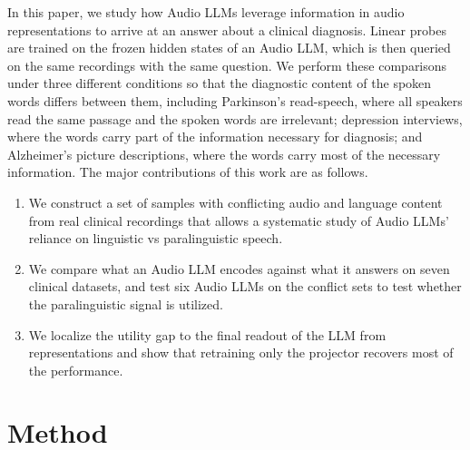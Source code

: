 \documentclass{article}
\begin{document}
In this paper, we study how Audio LLMs leverage information in audio representations to arrive at an answer about a clinical diagnosis. Linear probes are trained on the frozen hidden states of an Audio LLM, which is then queried on the same recordings with the same question. We perform these comparisons under three different conditions so that the diagnostic content of the spoken words differs between them, including Parkinson's read-speech, where all speakers read the same passage and the spoken words are irrelevant; depression interviews, where the words carry part of the information necessary for diagnosis; and Alzheimer's picture descriptions, where the words carry most of the necessary information. %
The major contributions of this work are as follows.
\begin{enumerate}[leftmargin=*,itemsep=0pt,topsep=0pt,parsep=0pt]
\item We construct a set of samples with conflicting audio and language content from real clinical recordings that allows a systematic study of Audio LLMs' reliance on linguistic vs paralinguistic speech.
\item We compare what an Audio LLM encodes against what it answers on seven clinical datasets, and test six Audio LLMs on the conflict sets to test whether the paralinguistic signal is utilized.
\item We localize the utility gap to the final readout of the LLM from representations and show that retraining only the projector recovers most of the performance.
\end{enumerate}


\section{Method}\label{sec:setup}
\end{document}
